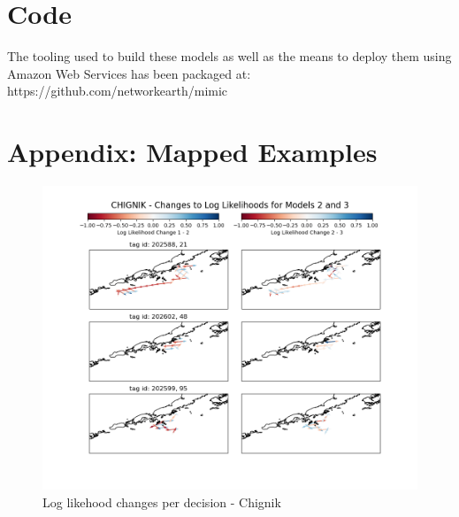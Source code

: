 \documentclass[11pt]{article}
\begin{document}
\newpage

\section*{Code}

The tooling used to build these models as well as the means to deploy them using Amazon Web Services has been packaged at: \newline https://github.com/networkearth/mimic



\newpage
\section*{Appendix: Mapped Examples}

\begin{figure}[h!] 
	\centering
  \includegraphics[width=140mm]{figures/chignik_map.png}
  \caption{Log likehood changes per decision - Chignik}
  \label{fig:chignik_map}
\end{figure}
\end{document}
